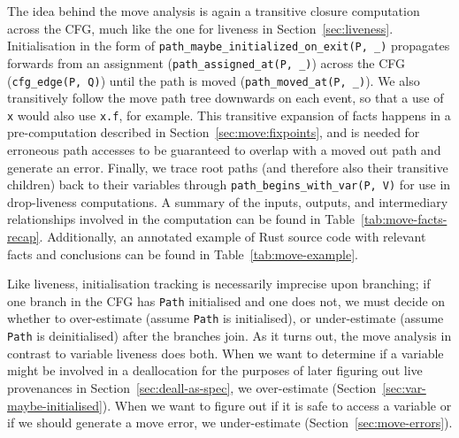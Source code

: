 \documentclass[11pt,a4paper,twoside,openany]{report}
\newcommand{\InRust}[1]{\texttt{#1}}
\newcommand{\InDatalog}[1]{\texttt{#1}}
\renewcommand\_{\textunderscore\allowbreak}
\begin{document}
The idea behind the move analysis is again a transitive closure computation
across the CFG, much like the one for liveness in Section~\ref{sec:liveness}.
Initialisation in the form of \InDatalog{path_maybe_initialized_on_exit(P, _)}
propagates forwards from an assignment (\InDatalog{path_assigned_at(P, _)})
across the CFG (\InDatalog{cfg_edge(P, Q)}) until the path is moved
(\InDatalog{path_moved_at(P, _)}). We also transitively follow the move path
tree downwards on each event, so that a use of \InRust{x} would also use
\InRust{x.f}, for example. This transitive expansion of facts happens in a
pre-computation described in Section~\ref{sec:move:fixpoints}, and is needed for
erroneous path accesses to be guaranteed to overlap with a moved out path and
generate an error. Finally, we trace root paths (and therefore also their
transitive children) back to their variables through
\InDatalog{path_begins_with_var(P, V)} for use in drop-liveness computations. A
summary of the inputs, outputs, and intermediary relationships involved in the
computation can be found in Table~\ref{tab:move-facts-recap}. Additionally, an
annotated example of Rust source code with relevant facts and conclusions can be
found in Table~\ref{tab:move-example}.

Like liveness, initialisation tracking is necessarily imprecise upon branching;
if one branch in the CFG has \InDatalog{Path} initialised and one does not, we
must decide on whether to over-estimate (assume \InDatalog{Path} is
initialised), or under-estimate (assume \InDatalog{Path} is deinitialised) after
the branches join. As it turns out, the move analysis in contrast to variable
liveness does both. When we want to determine if a variable might be involved in
a deallocation for the purposes of later figuring out live provenances in
Section~\ref{sec:deall-as-spec}, we over-estimate
(Section~\ref{sec:var-maybe-initialised}). When we want to figure out if it is
safe to access a variable or if we should generate a move error, we
under-estimate (Section~\ref{sec:move-errors}).
\end{document}

